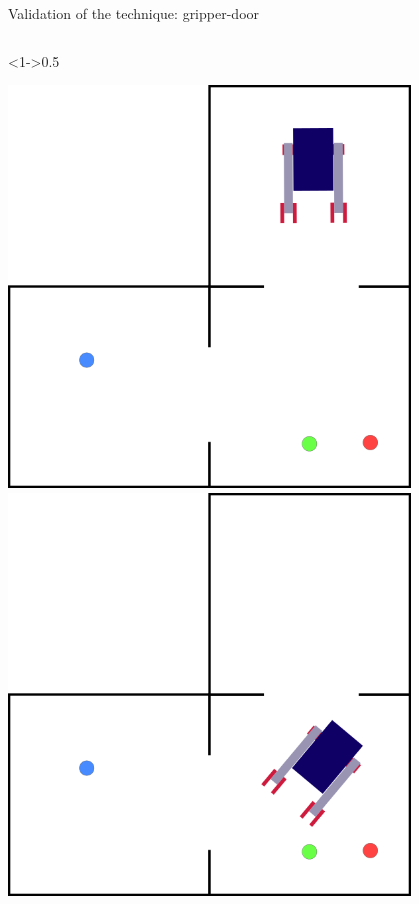 \begin{frame}[c,fragile]{Validation of the technique: gripper-door}
\begin{columns}[T]
    \begin{column}<1->{0.5\textwidth}
        \centering

        \begin{overprint}
            \includegraphics[width = 0.8\textwidth]{images/3_rooms/gd_3_0.png}
            \includegraphics[width = 0.8\textwidth]{images/3_rooms/gd_3_1.png}

\end{overprint}
\end{column}
\end{columns}
\end{frame}
